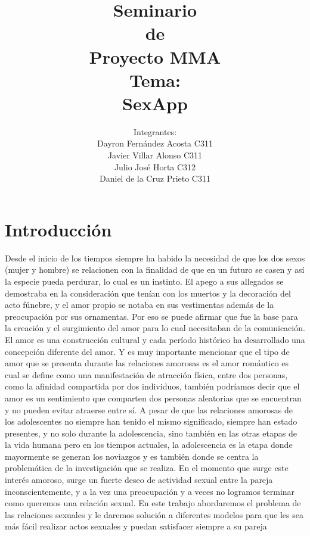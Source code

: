 \documentclass{llncs}
\title{\large\huge Seminario\\ de \\Proyecto MMA\\ \small Tema:\\ SexApp}
\author{ Integrantes: \\ Dayron Fernández Acosta C311\\ Javier Villar Alonso C311 \\ Julio José Horta C312\\ Daniel de la Cruz Prieto C311\\ }
\begin{document}
\maketitle
\newpage

\section{Introducción}
Desde el inicio de los tiempos siempre ha habido la necesidad de que los dos sexos (mujer y hombre) se relacionen con la finalidad de que en un futuro se casen y así la especie pueda perdurar, lo cual es un instinto. El apego a sus allegados se demostraba en la consideración que tenían con los muertos y la decoración del acto fúnebre, y el amor propio se notaba en sus vestimentas además de la preocupación por sus ornamentas. Por eso se puede afirmar que fue la base para la creación y el surgimiento del amor para lo cual necesitaban de la comunicación.
\newline
\newline
El amor es una construcción cultural y cada período histórico ha desarrollado una concepción diferente del amor. Y es muy importante mencionar que el tipo de amor que se presenta durante las relaciones amorosas es el amor romántico es cual se define como una manifestación de atracción física, entre dos personas, como la afinidad compartida por dos individuos, también podríamos decir que el amor es un sentimiento que comparten dos personas aleatorias que se encuentran y no pueden evitar atraerse entre sí. A pesar de que las relaciones amorosas de los adolescentes no siempre han tenido el mismo significado, siempre han estado presentes, y no solo durante la adolescencia, sino también en las otras etapas de la vida humana pero en los tiempos actuales, la adolescencia es la etapa donde mayormente se generan los noviazgos y es también donde se centra la problemática de la investigación que se realiza. 
\newline
\newline
En el momento que surge este interés amoroso, surge un fuerte deseo de actividad sexual entre la pareja inconscientemente, y a la vez una preocupación y a veces no logramos terminar como queremos una relación sexual.
\newline
\newline
En este trabajo abordaremos el problema de las relaciones sexuales y le daremos solución a diferentes modelos para que les sea más fácil realizar actos sexuales y puedan satisfacer siempre a su pareja
\end{document}
